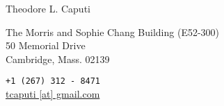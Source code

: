 \documentclass[11pt, letterpaper]{article}
\newcommand*{\img}[1]{%
    \raisebox{-.3\baselineskip}{%
        \texttt{[image: \#1]}%
    }%
}
\begin{document}
\large
{\huge Theodore L. Caputi}\\[.55cm]
%
%


\noindent{\tabcolsep}\begin{minipage}{0.6\linewidth}
The Morris and Sophie Chang Building (E52-300)\\
50 Memorial Drive\\
Cambridge, Mass. 02139 %
\end{minipage}
\begin{minipage}{0.4\linewidth}
\texttt{+1 (267) 312 - 8471}\\
\href{mailto:tcaputi@gmail.com}{tcaputi [at] gmail.com}\\
\end{minipage}\\[.2cm]
%
\end{document}
